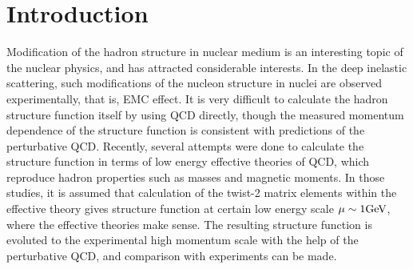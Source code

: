\section{Introduction}
\bs
Modification of the hadron structure in nuclear medium is
an interesting topic of the nuclear physics, and has attracted
considerable interests.    In the deep inelastic scattering, such
modifications of the
nucleon structure in nuclei are observed experimentally, that is, EMC
effect\cite{EMC}.
It is very difficult to calculate the hadron structure function
itself by using
QCD directly, though the measured momentum dependence of the structure
function is
consistent with predictions of the perturbative QCD.   Recently,
several attempts were done to calculate the structure function in
terms of
low energy effective theories of QCD, which reproduce hadron
properties such as masses and magnetic moments\cite{Jaffe-Ross}.
In those studies, it is assumed
that calculation of the twist-2 matrix elements within the effective
theory gives  structure function at certain low energy scale
$\mu \sim 1 \mbox{GeV}$,
where the effective theories make sense.
The resulting structure function is evoluted to the experimental high
momentum scale with the help of the perturbative QCD,
and comparison with experiments can be made\cite{Models1,Models2}.


